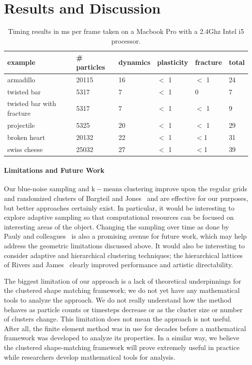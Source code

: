 \documentclass[review]{acmsiggraph}
\begin{document}
\section{Results and Discussion}
\label{sec:results}
\begin{table}
\begin{center}
\caption{Timing results in ms per frame taken on a Macbook Pro with a 2.4Ghz Intel i5 processor.}
\label{table:timing}
\begin{tabular}{|l|l|l|l|l|l|}
\hline
example & \# particles & dynamics & plasticity & fracture & total\\
\hline
armadillo & 20115 & 16  & $<$ 1 & $<$ 1 & 24\\
twisted bar & 5317 & 7 & $<$ 1  & 0 & 7\\
twisted bar with fracture & 5317 & 7  & $<$ 1 & $<$ 1 & 9 \\
projectile & 5325 & 20 & $<$ 1 & $<$ 1 & 29\\
broken heart & 20132 & 22 & $<$ 1 & $<$1 & 31\\
swiss cheese & 25032 & 27 & $<$ 1 & $<$1 & 39 \\
\hline
\end{tabular}
\end{center}
\end{table}

\paragraph{Limitations and Future Work}

Our blue-noise sampling and $\mathrm{k-means}$ clustering improve upon the regular grids and
randomized clusters of Bargteil and Jones~ and are effective for our purposes,
but better approaches certainly exist.  In particular, it would be interesting to explore adaptive sampling
so that computational resources can be focused on interesting areas of the object.  
Changing the sampling over time as done by Pauly and colleagues~
is also a promising avenue for future work, which may help address the geometric limitations discussed above.
It would also be interesting
to consider adaptive and hierarchical clustering techniques; the hierarchical lattices of Rivers and James~\cite{Rivers:2007:FFL}
clearly improved performance and artistic directability.  

The biggest limitation of our approach is a lack of theoretical underpinnings for the clustered shape matching
framework; we do not yet have any mathematical tools to analyze the approach.  We do not really understand
how the method behaves as particle counts or timesteps decrease or as the cluster size or number of clusters change.
This limitation does not mean the approach is not useful.  After all, the finite element method was in use
for decades before a mathematical framework was developed to analyze its properties.  In a similar way,
we believe the clustered shape-matching framework will prove extremely useful in practice while
researchers develop mathematical tools for analysis. 
\end{document}
